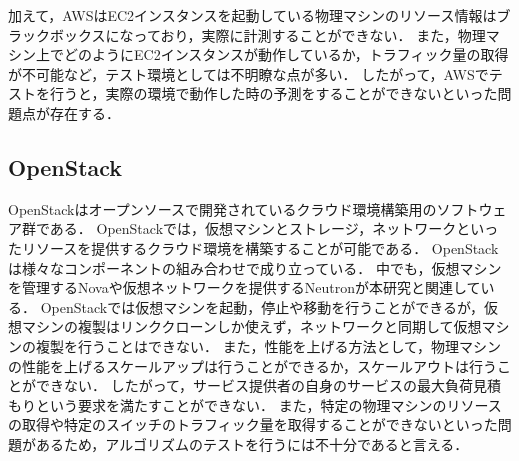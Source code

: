 \documentclass[submit,techrep]{ipsj}
\begin{document}
加えて，AWSはEC2インスタンスを起動している物理マシンのリソース情報はブラックボックスになっており，実際に計測することができない．
また，物理マシン上でどのようにEC2インスタンスが動作しているか，トラフィック量の取得が不可能など，テスト環境としては不明瞭な点が多い．
したがって，AWSでテストを行うと，実際の環境で動作した時の予測をすることができないといった問題点が存在する．

\subsection{OpenStack\cite{openstack}}
OpenStackはオープンソースで開発されているクラウド環境構築用のソフトウェア群である．
OpenStackでは，仮想マシンとストレージ，ネットワークといったリソースを提供するクラウド環境を構築することが可能である．
OpenStackは様々なコンポーネントの組み合わせで成り立っている．
中でも，仮想マシンを管理するNovaや仮想ネットワークを提供するNeutronが本研究と関連している．
OpenStackでは仮想マシンを起動，停止や移動を行うことができるが，仮想マシンの複製はリンククローンしか使えず，ネットワークと同期して仮想マシンの複製を行うことはできない．
また，性能を上げる方法として，物理マシンの性能を上げるスケールアップは行うことができるか，スケールアウトは行うことができない．
したがって，サービス提供者の自身のサービスの最大負荷見積もりという要求を満たすことができない．
また，特定の物理マシンのリソースの取得や特定のスイッチのトラフィック量を取得することができないといった問題があるため，アルゴリズムのテストを行うには不十分であると言える．

\end{document}

